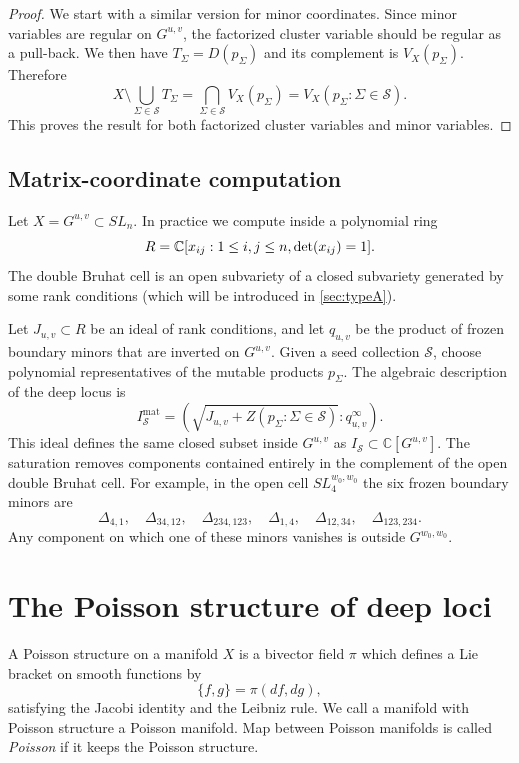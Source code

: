 \documentclass[12pt]{amsart}
\newcommand{\C}{\mathbb C}
\newcommand{\cS}{\mathcal S}
\theoremstyle{plain}
\theoremstyle{definition}
\theoremstyle{remark}
\begin{document}
\begin{proof}
We start with a similar version for minor coordinates. Since minor variables are regular on $G^{u,v}$, the factorized cluster variable should be regular as a pull-back. We then have $T_\Sigma=D(p_\Sigma)$ and its complement is $V_X(p_\Sigma)$.  Therefore
\[
 X\setminus\bigcup_{\Sigma\in\cS}T_\Sigma
 =\bigcap_{\Sigma\in\cS}V_X(p_\Sigma)
 =V_X(p_\Sigma:\Sigma\in\cS).
\]
This proves the result for both factorized cluster variables and minor variables.
\end{proof}


\subsection{Matrix-coordinate computation}

Let $X=G^{u,v}\subset SL_n$.  In practice we compute inside a polynomial ring
\[
   R=\C[x_{ij}:1\leq i,j\leq n, \textup{det}(x_{ij}) = 1 ].
\]
The double Bruhat cell is an open subvariety of a closed subvariety generated by some rank conditions (which will be introduced in \ref{sec:typeA}). 
\medskip
 
Let $J_{u,v}\subset R$ be an ideal of rank conditions, and let $q_{u,v}$ be the product of frozen boundary minors that are inverted on $G^{u,v}$.  Given a seed collection $\cS$, choose polynomial representatives of the mutable products $p_\Sigma$.  The algebraic description of the deep locus is
\[
   I_{\cS}^{\mathrm{mat}}
   =\left(\sqrt{J_{u,v}+Z(p_\Sigma:\Sigma\in\cS)}:q_{u,v}^{\infty}\right).
\]
This ideal defines the same closed subset inside $G^{u,v}$ as $I_\cS\subset\C[G^{u,v}]$. The saturation removes components contained entirely in the complement of the open double Bruhat cell.  For example, in the open cell $SL_4^{w_0,w_0}$ the six frozen boundary minors are
\[
   \Delta_{4,1},\quad
   \Delta_{34,12},\quad
   \Delta_{234,123},\quad
   \Delta_{1,4},\quad
   \Delta_{12,34},\quad
   \Delta_{123,234}.
\]
Any component on which one of these minors vanishes is outside $G^{w_0,w_0}$. 


\section{The Poisson structure of deep loci}\label{sec:poisson}

A Poisson structure on a manifold $X$ is a bivector field $\pi$ which defines a Lie bracket on smooth functions by
\[
\{f,g\}=\pi(df,dg),
\]
satisfying the Jacobi identity and the Leibniz rule. We call a manifold with Poisson structure a Poisson manifold. Map between Poisson manifolds is called \emph{Poisson} if it keeps the Poisson structure.  
\end{document}
